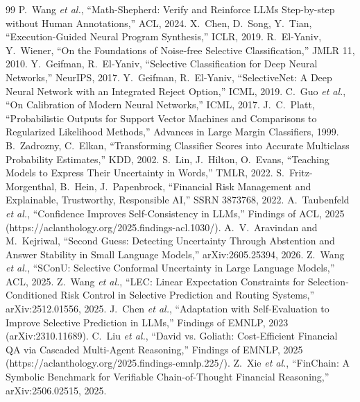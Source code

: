 \documentclass[conference]{IEEEtran}
\begin{document}
\begin{thebibliography}{99}
 P.~Wang \emph{et al.}, ``Math-Shepherd: Verify and Reinforce LLMs Step-by-step without Human Annotations,'' ACL, 2024.
 X.~Chen, D.~Song, Y.~Tian, ``Execution-Guided Neural Program Synthesis,'' ICLR, 2019.
 R.~El-Yaniv, Y.~Wiener, ``On the Foundations of Noise-free Selective Classification,'' JMLR 11, 2010.
 Y.~Geifman, R.~El-Yaniv, ``Selective Classification for Deep Neural Networks,'' NeurIPS, 2017.
 Y.~Geifman, R.~El-Yaniv, ``SelectiveNet: A Deep Neural Network with an Integrated Reject Option,'' ICML, 2019.
 C.~Guo \emph{et al.}, ``On Calibration of Modern Neural Networks,'' ICML, 2017.
 J.~C.~Platt, ``Probabilistic Outputs for Support Vector Machines and Comparisons to Regularized Likelihood Methods,'' Advances in Large Margin Classifiers, 1999.
 B.~Zadrozny, C.~Elkan, ``Transforming Classifier Scores into Accurate Multiclass Probability Estimates,'' KDD, 2002.
 S.~Lin, J.~Hilton, O.~Evans, ``Teaching Models to Express Their Uncertainty in Words,'' TMLR, 2022.
 S.~Fritz-Morgenthal, B.~Hein, J.~Papenbrock, ``Financial Risk Management and Explainable, Trustworthy, Responsible AI,'' SSRN 3873768, 2022.
 A.~Taubenfeld \emph{et al.}, ``Confidence Improves Self-Consistency in LLMs,'' Findings of ACL, 2025 (https://aclanthology.org/2025.findings-acl.1030/).
 A.~V.~Aravindan and M.~Kejriwal, ``Second Guess: Detecting Uncertainty Through Abstention and Answer Stability in Small Language Models,'' arXiv:2605.25394, 2026.
 Z.~Wang \emph{et al.}, ``SConU: Selective Conformal Uncertainty in Large Language Models,'' ACL, 2025.
 Z.~Wang \emph{et al.}, ``LEC: Linear Expectation Constraints for Selection-Conditioned Risk Control in Selective Prediction and Routing Systems,'' arXiv:2512.01556, 2025.
 J.~Chen \emph{et al.}, ``Adaptation with Self-Evaluation to Improve Selective Prediction in LLMs,'' Findings of EMNLP, 2023 (arXiv:2310.11689).
 C.~Liu \emph{et al.}, ``David vs. Goliath: Cost-Efficient Financial QA via Cascaded Multi-Agent Reasoning,'' Findings of EMNLP, 2025 (https://aclanthology.org/2025.findings-emnlp.225/).
 Z.~Xie \emph{et al.}, ``FinChain: A Symbolic Benchmark for Verifiable Chain-of-Thought Financial Reasoning,'' arXiv:2506.02515, 2025.
\end{thebibliography}
\end{document}
